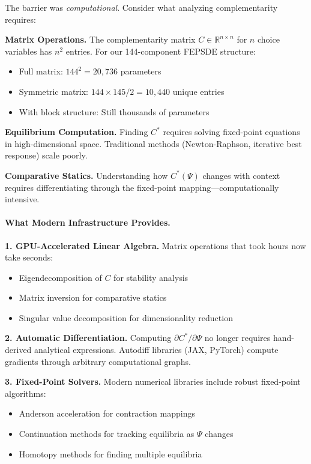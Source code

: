 \documentclass[12pt,a4paper]{article}
\begin{document}
The barrier was \emph{computational}. Consider what analyzing complementarity requires:

\textbf{Matrix Operations.}
The complementarity matrix $C \in \mathbb{R}^{n \times n}$ for $n$ choice variables
has $n^2$ entries. For our 144-component FEPSDE structure:
\begin{itemize}
  \item Full matrix: $144^2 = 20,736$ parameters
  \item Symmetric matrix: $144 \times 145 / 2 = 10,440$ unique entries
  \item With block structure: Still thousands of parameters
\end{itemize}

\textbf{Equilibrium Computation.}
Finding $C^*$ requires solving fixed-point equations in high-dimensional space.
Traditional methods (Newton-Raphson, iterative best response) scale poorly.

\textbf{Comparative Statics.}
Understanding how $C^*(\Psi)$ changes with context requires
differentiating through the fixed-point mapping---computationally intensive.

\paragraph{What Modern Infrastructure Provides.}

\textbf{1. GPU-Accelerated Linear Algebra.}
Matrix operations that took hours now take seconds:
\begin{itemize}
  \item Eigendecomposition of $C$ for stability analysis
  \item Matrix inversion for comparative statics
  \item Singular value decomposition for dimensionality reduction
\end{itemize}

\textbf{2. Automatic Differentiation.}
Computing $\partial C^* / \partial \Psi$ no longer requires 
hand-derived analytical expressions. Autodiff libraries (JAX, PyTorch)
compute gradients through arbitrary computational graphs.

\textbf{3. Fixed-Point Solvers.}
Modern numerical libraries include robust fixed-point algorithms:
\begin{itemize}
  \item Anderson acceleration for contraction mappings
  \item Continuation methods for tracking equilibria as $\Psi$ changes
  \item Homotopy methods for finding multiple equilibria
\end{itemize}
\end{document}

